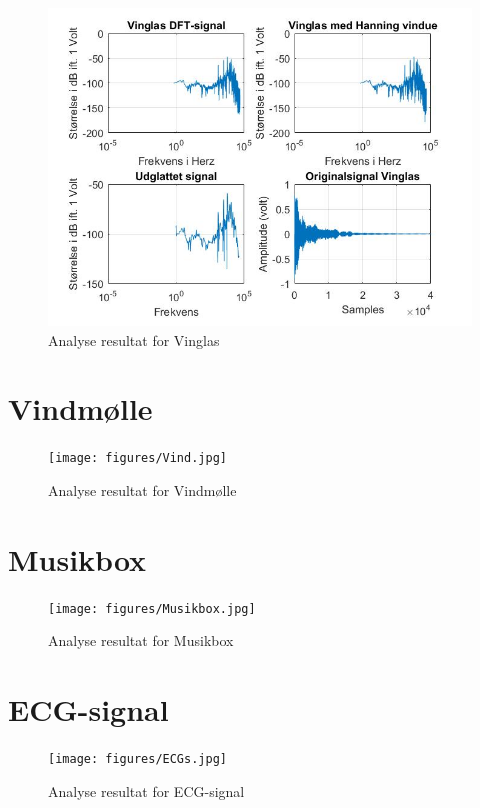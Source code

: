 \begin{figure}[ht!]
	\centering
	\includegraphics[width=180mm]{figures/Vinglas.jpg}
	\caption{Analyse resultat for Vinglas}
	\label{fig:Vinglas}
\end{figure}

\section{Vindmølle}
\begin{figure}[ht!]
	\centering
	\texttt{[image: figures/Vind.jpg]}
	\caption{Analyse resultat for Vindmølle}
	\label{fig:Vindmølle}
\end{figure}


\section{Musikbox}
\begin{figure}[ht!]
	\centering
	\texttt{[image: figures/Musikbox.jpg]}
	\caption{Analyse resultat for Musikbox}
	\label{fig:Musikbox}
\end{figure}

\section{ECG-signal}
\begin{figure}[ht!]
	\centering
	\texttt{[image: figures/ECGs.jpg]}
	\caption{Analyse resultat for ECG-signal}
	\label{fig:ECG-signal}
\end{figure}
